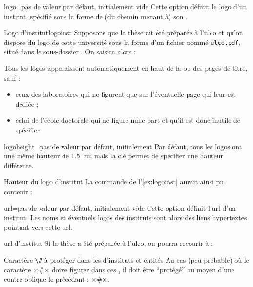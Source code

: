 \begin{docKey}{logo}{=}{pas de valeur
    par défaut, initialement vide}
  Cette option définit le logo d'un institut, spécifié sous la forme de (du
  chemin menant à) son .
  \begin{dbexample}{Logo d'institut}{logoinst}
    Supposons que la thèse ait été préparée à l'\gls{ulco} et qu'on dispose du
    logo de cette université sous la forme d'un fichier nommé
    \texttt{ulco.pdf}, situé dans le sous-dossier . On
    saisira alors :
\begin{bodycode}
\end{bodycode}
\end{dbexample}
Tous les logos apparaissent automatiquement en haut de la ou des
pages de titre, sauf :
\begin{itemize}
\item ceux des laboratoires qui ne figurent que sur l'éventuelle page qui leur
  est dédiée ;
\item celui de l'école doctorale qui ne figure nulle part et qu'il est donc
  inutile de spécifier.
\end{itemize}
\end{docKey}
%
\begin{docKey}{logoheight}{=}{pas de valeur par
    défaut, initialement \docValue*{1.5cm}}
  Par défaut, tous les logos ont une même hauteur de \SI{1.5}{\cm}
  mais la clé  permet de spécifier une hauteur
  différente.
  \begin{dbexample}{Hauteur du logo d'institut}{}
    La commande de l'\vref{ex:logoinst} aurait ainsi pu contenir :
\begin{bodycode}
\end{bodycode}
\end{dbexample}
\end{docKey}
%
%
\begin{docKey}{url}{=}{pas de valeur par
    défaut, initialement vide}
  Cette option définit l'\acrshort{url} d'un institut. Les noms et éventuels
  logos des instituts sont alors des liens hypertextes pointant vers cette
  \acrshort{url}.
  \begin{dbexample}{\acrshort*{url} d'institut}{}
    Si la thèse a été préparée à l'\gls{ulco}, on pourra recourir à :%
    \NoAutoSpacing%
\begin{bodycode}
\end{bodycode}
\end{dbexample}
\begin{dbwarning}{Caractère \protect\lstinline+\#+ à protéger dans les
     d'instituts et entités}{}
  Au cas (peu probable) où le caractère ×#× doive figurer dans ces
  , il doit être \enquote{protégé} au moyen d'une
  contre-oblique le précédant : ×\#×.
\end{dbwarning}
\end{docKey}

